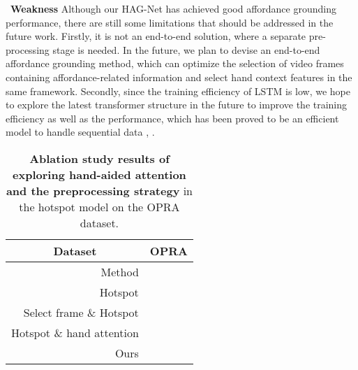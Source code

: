 \documentclass[journal,twoside]{IEEEtran}
\newcommand{\myPara}[1]{\vspace{5pt}\noindent~\textbf{#1} \quad}
\begin{document}
\myPara{Weakness}
Although our HAG-Net has achieved good affordance grounding performance, there are still some limitations that should be addressed in the future work. Firstly, it is not an end-to-end solution, where a separate pre-processing stage is needed. In the future, we plan to devise an end-to-end affordance grounding method, which can optimize the selection of video frames containing affordance-related information and select hand context features in the same framework. Secondly, since the training efficiency of LSTM is low, we hope to explore the latest transformer structure in the future to improve the training efficiency as well as the performance, which has been proved to be an efficient model to handle sequential data \cite{vaswani2017attention,khan2021transformers}, \cite{girdhar2021anticipative}. 

\begin{table}[t]
\caption{\textbf{Ablation study results of exploring hand-aided attention and the preprocessing strategy} in the hotspot \cite{interaction-hotspots} model on the OPRA \cite{demo2vec2018cvpr} dataset.}
  \begin{center}
 \small
  \renewcommand{\arraystretch}{1.}
  \renewcommand{\tabcolsep}{5.pt}
  \begin{tabular}{r|cccc}
    \hline\toprule
    \multicolumn{1}{c|}{\textbf{Dataset}} & \multicolumn{4}{c}{\textbf{OPRA} \cite{demo2vec2018cvpr}} \\
    \hline
    Method &  &  &   &  \\
    \hline
    Hotspot \cite{interaction-hotspots} &  &  &   &  \\
    Select frame \& Hotspot  \cite{interaction-hotspots}  &  &   &  &  \\
    Hotspot \cite{interaction-hotspots} \& hand attention &  &  &    &     \\
   \hline
   \rowcolor{mygray}
   Ours &  &  &  &   \\
    \hline\bottomrule
    \end{tabular}
    \end{center}
  \label{Table:6}
  \end{table}
\end{document}

